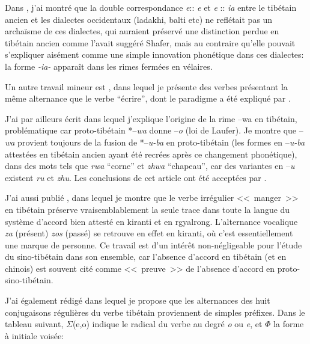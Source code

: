 \documentclass[oldfontcommands,oneside,a4paper,11pt]{memoir}
\newcommand{\sig}{\begin{math}\Sigma\end{math}}
\newcommand{\phone}{\begin{math}\Phi\end{math}}
\begin{document}
Dans \citet{jacques09e}, j'ai montré que la double correspondance \textit{e}:: \textit{e} et \textit{e} :: \textit{ia} entre le tibétain ancien et les dialectes occidentaux (ladakhi, balti etc) ne reflétait pas un archaïsme de ces dialectes, qui auraient préservé une distinction perdue en tibétain ancien comme l'avait suggéré Shafer, mais au contraire qu'elle pouvait s'expliquer aisément comme une simple innovation phonétique dans ces dialectes: la forme \textit{-ia-} apparaît dans les rimes fermées en vélaires.

Un autre travail mineur est \citet{jacques10ndr}, dans lequel je présente des verbes présentant la même alternance que le verbe ``écrire'', dont le paradigme a été expliqué par \citet{hill05vbri}.

J'ai par ailleurs écrit \citet{jacques09wazur} dans lequel j'explique l'origine de la rime --wa en tibétain, problématique car proto-tibétain *--\textit{wa} donne --\textit{o} (loi de Laufer). Je montre que --\textit{wa} provient toujours de la fusion de *--\textit{u-ba} en proto-tibétain (les formes en --\textit{u-ba} attestées en tibétain ancien ayant été recrées après ce changement phonétique), dans des mots tels que \textit{rwa} ``corne'' et \textit{zhwa} ``chapeau'', car des variantes en --\textit{u} existent \textit{ru} et \textit{zhu}. Les conclusions de cet article ont été acceptées par \citealt{hill11laws}.

J'ai aussi publié \citet{jacques10zos}, dans lequel je montre que le verbe irrégulier <<~manger~>> en tibétain préserve vraisemblablement la seule trace dans toute la langue du système d'accord bien attesté en kiranti et en rgyalrong. L'alternance vocalique \textit{za} (présent) \textit{zos} (passé) se retrouve en effet en kiranti, où c'est essentiellement une marque de personne.
Ce travail est d'un intérêt non-négligeable pour l'étude du sino-tibétain dans son ensemble, car l'absence d'accord en tibétain (et en chinois) est souvent cité comme <<~preuve~>> de l'absence d'accord en proto-sino-tibétain.

J'ai également rédigé \citet{jacques12internal} dans lequel je propose que les alternances des huit conjugaisons régulières du verbe tibétain proviennent de simples préfixes. Dans le tableau suivant, \sig{}(e,o) indique le radical du verbe au degré \textit{o} ou \textit{e}, et \phone{} la forme à initiale voisée:
\end{document}
